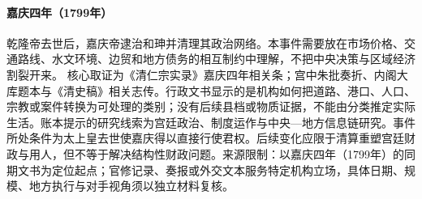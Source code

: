 \hypertarget{civic:EQ-1799-HESHEN-PURGE}{}\paragraph{嘉庆四年（1799年）}乾隆帝去世后，嘉庆帝逮治和珅并清理其政治网络。本事件需要放在市场价格、交通路线、水文环境、边贸和地方债务的相互制约中理解，不把中央决策与区域经济割裂开来。 核心取证为《清仁宗实录》嘉庆四年相关条；宫中朱批奏折、内阁大库题本与《清史稿》相关志传。行政文书显示的是机构如何把道路、港口、人口、宗教或案件转换为可处理的类别；没有后续县档或物质证据，不能由分类推定实际生活。账本提示的研究线索为宫廷政治、制度运作与中央—地方信息链研究。事件所处条件为太上皇去世使嘉庆得以直接行使君权。后续变化应限于清算重塑宫廷财政与用人，但不等于解决结构性财政问题。来源限制：以嘉庆四年（1799年）的同期文书为定位起点；官修记录、奏报或外交文本服务特定机构立场，具体日期、规模、地方执行与对手视角须以独立材料复核。
